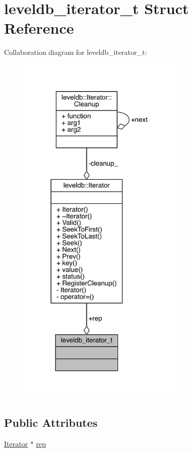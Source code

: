 \hypertarget{structleveldb__iterator__t}{}\section{leveldb\+\_\+iterator\+\_\+t Struct Reference}
\label{structleveldb__iterator__t}


Collaboration diagram for leveldb\+\_\+iterator\+\_\+t\+:\nopagebreak
\begin{figure}[H]
\begin{center}
\leavevmode
\includegraphics[width=224pt]{structleveldb__iterator__t__coll__graph}
\end{center}
\end{figure}
\subsection*{Public Attributes}
\begin{DoxyCompactItemize}
\item 
\hyperlink{classleveldb_1_1_iterator}{Iterator} $\ast$ \hyperlink{structleveldb__iterator__t_a051a1df01c49d34f34628ae1467f9377}{rep}
\end{DoxyCompactItemize}


